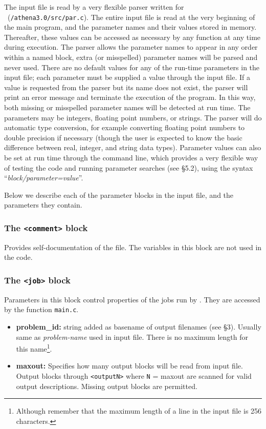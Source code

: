 The input file is read by a very flexible parser written for \ath\
({\tt /athena3.0/src/par.c}).  The entire input file is read at the
very beginning of the main program, and the parameter names and their
values stored in memory.  Thereafter, these values can be accessed as
necessary by any function at any time during execution.  The parser
allows the parameter names to appear in any order within a named
block, extra (or misspelled) parameter names will be parsed and never
used.  There are no default values for any of the run-time parameters
in the input file; each parameter must be supplied a value through the
input file.  If a value is requested from the parser but its name does
not exist, the parser will print an error message and terminate the
execution of the program.  In this way, both missing or misspelled
parameter names will be detected at run time.  The parameters may be
integers, floating point numbers, or strings.  The parser will do
automatic type conversion, for example converting floating point
numbers to double precision if necessary (though the user is expected
to know the basic difference between real, integer, and string data
types).  Parameter values can also be set at run time through the
command line, which provides a very flexible way of testing the code
and running parameter searches (see \S 5.2),
using the syntax ``{\it block/parameter=value}''.

Below we describe each of the parameter blocks in the input file,
and the parameters they contain.

\subsubsection{The {\tt <comment>} block}

Provides self-documentation of the file.  The variables in this block
are not used in the code.

\subsubsection{The {\tt <job>} block}

Parameters in this block control properties of the jobs run by \ath.
They are accessed by the function {\tt main.c}.
\begin{itemize}

\item {\bf problem\_id:}
string added as basename of output filenames (see \S 3).  Usually same
as {\it problem-name} used in input file.  There is no maximum length
for this name\footnote{Although remember that the maximum length of a
line in the input file is 256 characters.}.

\item {\bf maxout:} Specifies how many output blocks will be read from
input file.  Output
blocks {\tt<output1>} through {\tt<outputN>} where {\tt N} = maxout
are scanned for valid output descriptions.  Missing output
blocks are permitted.

\end{itemize}

